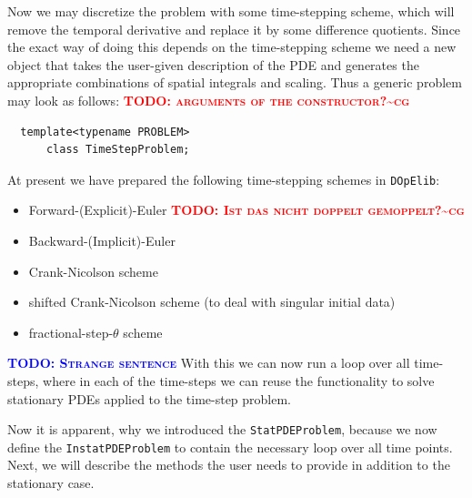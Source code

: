 \documentclass[prodmode,acmtoms]{acmsmall}
\numberwithin{equation}{section}
\newcommand{\dope}{\texttt{DOpElib}}
\newcommand{\todo}[1]{\textbf{\textsc{\textcolor{blue}{TODO: #1}}}}
\newcommand{\todocg}[1]{\textbf{\textsc{\textcolor{red}{TODO: #1\textasciitilde cg}}}}
\begin{document}
Now we may discretize the problem with some time-stepping scheme, which will 
remove the temporal derivative and replace it by some difference quotients. 
Since the exact way of doing this depends on the time-stepping scheme 
we need a new object that takes the user-given description of the PDE and 
generates the appropriate combinations of spatial integrals and scaling.
Thus a generic problem may look as follows:
\todocg{arguments of the constructor?}
\begin{lstlisting}
  template<typename PROBLEM>
      class TimeStepProblem;
\end{lstlisting}
At present we have prepared the following time-stepping schemes in \dope:
\begin{itemize}
\item Forward-(Explicit)-Euler \todocg{Ist das nicht doppelt gemoppelt?}
\item Backward-(Implicit)-Euler
\item Crank-Nicolson scheme
\item shifted Crank-Nicolson scheme (to deal with singular initial data)
\item fractional-step-$\theta$ scheme
\end{itemize}
\todo{Strange sentence} With this we can now run a loop over all time-steps, where in each of the 
time-steps we can reuse the functionality to solve stationary PDEs 
applied to the time-step problem. 

Now it is apparent, why we introduced the \texttt{StatPDEProblem}, because
we now define the \texttt{InstatPDEProblem} to contain the necessary 
loop over all time points. Next, we will describe the methods the user needs to 
provide in addition to the stationary case.
\end{document}
